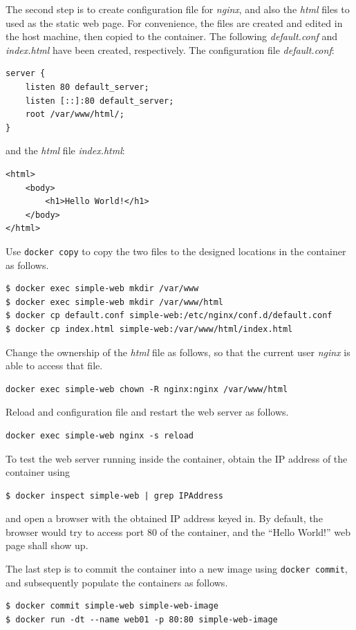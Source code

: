 The second step is to create configuration file for \textit{nginx}, and also the \textit{html} files to used as the static web page. For convenience, the files are created and edited in the host machine, then copied to the container. The following \textit{default.conf} and \textit{index.html} have been created, respectively. The configuration file \textit{default.conf}:
\begin{lstlisting}
server {
	listen 80 default_server;
	listen [::]:80 default_server;
	root /var/www/html/;
}
\end{lstlisting}
and the \textit{html} file \textit{index.html}:
\begin{lstlisting}
<html>
	<body>
		<h1>Hello World!</h1>
	</body>
</html>
\end{lstlisting}

Use \verb|docker copy| to copy the two files to the designed locations in the container as follows.
\begin{lstlisting}
$ docker exec simple-web mkdir /var/www
$ docker exec simple-web mkdir /var/www/html
$ docker cp default.conf simple-web:/etc/nginx/conf.d/default.conf
$ docker cp index.html simple-web:/var/www/html/index.html
\end{lstlisting}

Change the ownership of the \textit{html} file as follows, so that the current user \textit{nginx} is able to access that file.
\begin{lstlisting}
docker exec simple-web chown -R nginx:nginx /var/www/html
\end{lstlisting}

Reload and configuration file and restart the web server as follows.
\begin{lstlisting}
docker exec simple-web nginx -s reload
\end{lstlisting}

To test the web server running inside the container, obtain the IP address of the container using
\begin{lstlisting}
$ docker inspect simple-web | grep IPAddress
\end{lstlisting}
and open a browser with the obtained IP address keyed in. By default, the browser would try to access port 80 of the container, and the ``Hello World!'' web page shall show up.

The last step is to commit the container into a new image using \verb|docker commit|, and subsequently populate the containers as follows.
\begin{lstlisting}
$ docker commit simple-web simple-web-image
$ docker run -dt --name web01 -p 80:80 simple-web-image
\end{lstlisting}

